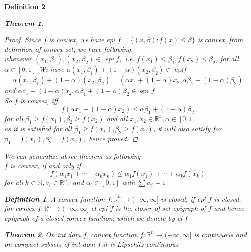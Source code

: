 \documentclass[oneside]{book}
\newtheorem{theorem}{Theorem}[section]
\newtheorem{mydef}{Definition}
\begin{document}
\begin{mydef}
\begin{theorem}
\begin{proof}
Since $f$ is convex, we have epi $f=\{(x, \beta): f(x) \leq \beta\}$ is convex, from definition of convex set, we have following. \\
whenever $\left(x_{1}, \beta_{1}\right),\left(x_{2}, \beta_{2}\right) \in$ epi $f,$ i.e. $f\left(x_{1}\right) \leq \beta_{1}, f\left(x_{2}\right) \leq \beta_{2}$, for all $\alpha \in[0,1]$
 We have
 $\alpha\left(x_{1}, \beta_{1}\right)+(1-\alpha)\left(x_{2}, \beta_{2}\right) \in \text{ epi} f$
 $$
\alpha\left(x_{1}, \beta_{1}\right)+(1-\alpha)\left(x_{2}, \beta_{2}\right)=  \left(\alpha x_{1}+(1-\alpha) x_{2}, \alpha \beta_{1}+(1-\alpha) \beta_{2}\right)
$$
and  $ \alpha x_{1}+(1-\alpha) x_{2}, \alpha \beta_{1}+(1-\alpha) \beta_{2} \in \text { epi } f $
\\
So $f$ is convex, iff.
$$
f\left(\alpha x_{1}+(1-\alpha) x_{2}\right) \leq \alpha \beta_{1}+(1-\alpha) \beta_{2}
$$
for   all $ \beta_{1} \geq f\left(x_{1}\right), \beta_{2} \geq f\left(x_{2}\right) $ and  all $ x_{1}, x_{2} \in \mathbb{R}^{n}, \alpha \in[0,1]$ \\
as it is satisfied for all $ \beta_{1} \geq f\left(x_{1}\right), \beta_{2} \geq f\left(x_{2}\right) $, it will also satisfy for $\beta_{1}=f\left(x_{1}\right), \beta_{2}=f\left(x_{2}\right),$  hence proved.  
\end{proof}
\end{theorem} 

We can  generalize above theorem as following \\
$f$ is convex, if and only if
\begin{equation}
\label{eq41}
f\left(\alpha_{1} x_{1}+\cdots+\alpha_{k} x_{k}\right) \leq \alpha_{1} f\left(x_{1}\right)+\cdots+\alpha_{k} f\left(x_{k}\right)
\end{equation}
for all $k \in \mathbb{N}, x_{i} \in \mathbb{R}^{n},$ and $\alpha_{i} \in[0,1]$ with $\sum \alpha_{i}=1$



\begin{mydef} \label{d:11}
 A convex function $f: \mathbb{R}^{n} \rightarrow(-\infty, \infty]$ is closed, if epi $f$ is closed.
for convex  $f: \mathbb{R}^{n} \rightarrow(-\infty, \infty]$   cl epi $f$ is the closer of set epigraph of $f$ and hence epigraph of a closed convex function, which we denote by cl $f$
\end{mydef}

\begin{theorem}	
\label{t:7.5}
 On int dom $f$, convex function $f: \mathbb{R}^{n} \rightarrow(-\infty, \infty]$ is continuous and on compact subsets of int dom $f$,it is Lipschitz continuous 	


\end{theorem}
\end{mydef}
\end{document}
